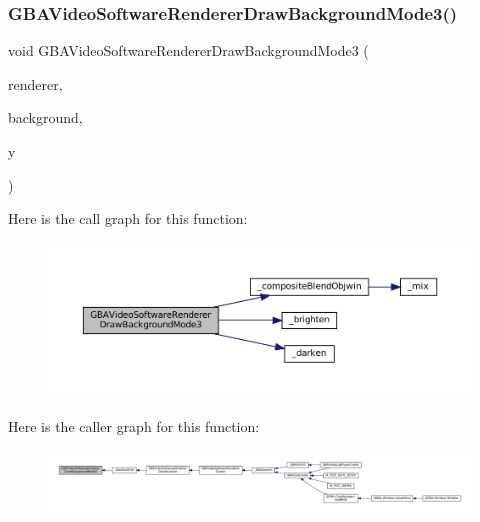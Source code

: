 \subsubsection{\texorpdfstring{G\+B\+A\+Video\+Software\+Renderer\+Draw\+Background\+Mode3()}{GBAVideoSoftwareRendererDrawBackgroundMode3()}}
{\footnotesize\ttfamily void G\+B\+A\+Video\+Software\+Renderer\+Draw\+Background\+Mode3 (\begin{DoxyParamCaption}\item[{struct G\+B\+A\+Video\+Software\+Renderer $\ast$}]{renderer,  }\item[{struct G\+B\+A\+Video\+Software\+Background $\ast$}]{background,  }\item[{\mbox{\hyperlink{ioapi_8h_a787fa3cf048117ba7123753c1e74fcd6}{int}}}]{y }\end{DoxyParamCaption})}

Here is the call graph for this function\+:
\nopagebreak
\begin{figure}[H]
\begin{center}
\leavevmode
\includegraphics[width=350pt]{software-private_8h_a5f6c2be8bd7b2cede91d2b562d7c34a9_cgraph}
\end{center}
\end{figure}
Here is the caller graph for this function\+:
\nopagebreak
\begin{figure}[H]
\begin{center}
\leavevmode
\includegraphics[width=350pt]{software-private_8h_a5f6c2be8bd7b2cede91d2b562d7c34a9_icgraph}
\end{center}
\end{figure}
\mbox{\label{software-private_8h_a0877e6bb6557f6b7069843bd995a3bce}} 
